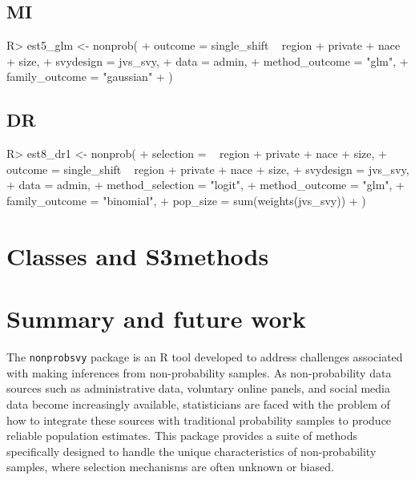 \documentclass[
]{jss}
\begin{document}
\hypertarget{mi}{%
\subsection{MI}\label{mi}}

\begin{CodeChunk}
\begin{CodeInput}
R> est5_glm <- nonprob(
+   outcome = single_shift ~ region + private + nace + size,
+   svydesign = jvs_svy,
+   data = admin,
+   method_outcome = "glm",
+   family_outcome = "gaussian"
+ )
\end{CodeInput}
\end{CodeChunk}

\hypertarget{dr}{%
\subsection{DR}\label{dr}}

\begin{CodeChunk}
\begin{CodeInput}
R> est8_dr1 <- nonprob(
+   selection = ~ region + private + nace + size,
+   outcome = single_shift ~ region + private + nace + size,
+   svydesign = jvs_svy,
+   data = admin,
+   method_selection = "logit",
+   method_outcome = "glm",
+   family_outcome = "binomial",
+   pop_size = sum(weights(jvs_svy))
+ )
\end{CodeInput}
\end{CodeChunk}

\hypertarget{classes-and-s3methods}{%
\section{Classes and S3methods}\label{classes-and-s3methods}}

\hypertarget{summary-and-future-work}{%
\section{Summary and future work}\label{summary-and-future-work}}

The \texttt{nonprobsvy} package is an R tool developed to address
challenges associated with making inferences from non-probability
samples. As non-probability data sources such as administrative data,
voluntary online panels, and social media data become increasingly
available, statisticians are faced with the problem of how to integrate
these sources with traditional probability samples to produce reliable
population estimates. This package provides a suite of methods
specifically designed to handle the unique characteristics of
non-probability samples, where selection mechanisms are often unknown or
biased.
\end{document}
